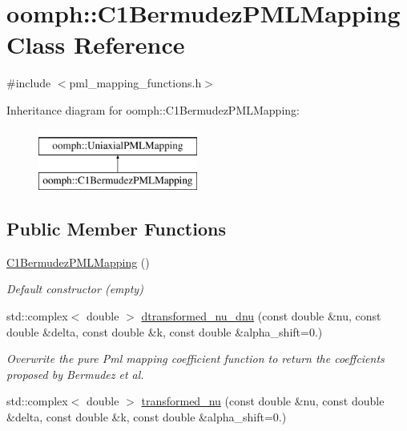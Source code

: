 \hypertarget{classoomph_1_1C1BermudezPMLMapping}{}\section{oomph\+:\+:C1\+Bermudez\+P\+M\+L\+Mapping Class Reference}
\label{classoomph_1_1C1BermudezPMLMapping}


{\ttfamily \#include $<$pml\+\_\+mapping\+\_\+functions.\+h$>$}

Inheritance diagram for oomph\+:\+:C1\+Bermudez\+P\+M\+L\+Mapping\+:\begin{figure}[H]
\begin{center}
\leavevmode
\includegraphics[height=2.000000cm]{classoomph_1_1C1BermudezPMLMapping}
\end{center}
\end{figure}
\subsection*{Public Member Functions}
\begin{DoxyCompactItemize}
\item 
\hyperlink{classoomph_1_1C1BermudezPMLMapping_aad48d50b2bffcd92693f24ccd2c60856}{C1\+Bermudez\+P\+M\+L\+Mapping} ()
\begin{DoxyCompactList}\small\item\em Default constructor (empty) \end{DoxyCompactList}\item 
std\+::complex$<$ double $>$ \hyperlink{classoomph_1_1C1BermudezPMLMapping_a6cd89443e778419f9f107971f5176607}{dtransformed\+\_\+nu\+\_\+dnu} (const double \&nu, const double \&delta, const double \&k, const double \&alpha\+\_\+shift=0.)
\begin{DoxyCompactList}\small\item\em Overwrite the pure Pml mapping coefficient function to return the coeffcients proposed by Bermudez et al. \end{DoxyCompactList}\item 
std\+::complex$<$ double $>$ \hyperlink{classoomph_1_1C1BermudezPMLMapping_a98426cf080db910b65f103696455d8b1}{transformed\+\_\+nu} (const double \&nu, const double \&delta, const double \&k, const double \&alpha\+\_\+shift=0.)
\end{DoxyCompactItemize}


